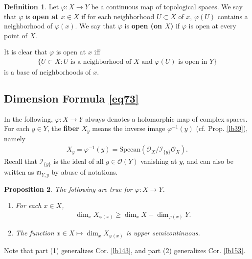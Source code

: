 \documentclass[12pt,b5paper,notitlepage]{report}
\theoremstyle{definition}
\newtheorem{df}{Definition}[section]
\theoremstyle{plain}
\newtheorem{pp}[df]{Proposition}
\newcommand{\fk}{\mathfrak}
\newcommand{\scr}{\mathscr}
\newcommand{\Specan}{\mathrm{Specan}}
\numberwithin{equation}{section}
\begin{document}
\begin{df}
Let $\varphi:X\rightarrow Y$ be a continuous map of topological spaces. We say that $\varphi$ is \textbf{open at $x\in X$}  if for each neighborhood $U\subset X$ of $x$, $\varphi(U)$ contains a neighborhood of $\varphi(x)$. We say that $\varphi$ is \textbf{open (on $X$)} if $\varphi$ is open at every point of $X$.

It is clear that $\varphi$ is open at $x$ iff
\begin{align*}
\{U\subset X:U\text{ is a neighborhood of }X\text{ and }\varphi(U)\text{ is open in }Y\}
\end{align*}
is a base of neighborhoods of $x$. \hfill\qedsymbol
\end{df}



\subsection{Dimension Formula \eqref{eq73}}



In the following, $\varphi:X\rightarrow Y$ always denotes a holomorphic map of complex spaces. For each $y\in Y$, the \textbf{fiber} $X_y$ means the inverse image $\varphi^{-1}(y)$ (cf. Prop. \ref{lb39}),  namely
\begin{align*}
X_y=\varphi^{-1}(y)=\Specan(\scr O_X/\scr I_{\{y\}}\scr O_X).
\end{align*}
Recall that $\scr I_{\{y\}}$ is the ideal of all $g\in\scr O(Y)$ vanishing at $y$, and can also be written as $\fk m_{Y,y}$ by abuse of notations.

\begin{pp}\label{lb151}
The following are true for $\varphi:X\rightarrow Y$.
\begin{enumerate}[label=(\arabic*)]
\item For each $x\in X$,
\begin{align}\label{eq195}
\dim_x X_{\varphi(x)}\geq\dim_x X-\dim_{\varphi(x)} Y.
\end{align}
\item The function $x\in X\mapsto \dim_x X_{\varphi(x)}$ is upper semicontinuous.
\end{enumerate}
\end{pp}

Note that part (1) generalizes Cor. \ref{lb143}, and part (2) generalizes Cor. \ref{lb153}.
\end{document}
